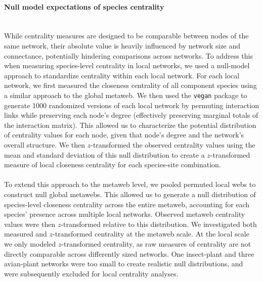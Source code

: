 \paragraph*{Null model expectations of species centrality}\mbox{}\\ 
While centrality measures are designed to be comparable between nodes of the same network, their absolute value is heavily influenced by network size and connectance, potentially hindering comparisons across networks. To address this when measuring species-level centrality in local networks, we used a null-model approach to standardize centrality within each local network. For each local network, we first measured the closeness centrality of all component species using a similar approach to the global metaweb.
We then used the \texttt{vegan} package to generate 1000 randomized versions of each local network by permuting interaction links while preserving each node's degree (effectively preserving marginal totals of the interaction matrix). This allowed us to characterize the potential distribution of centrality values for each node, given that node's degree and the network's overall structure. We then $z$-transformed the observed centrality values using the mean and standard deviation of this null distribution to create a $z$-transformed measure of local closeness centrality for each species-site combination. 


\paragraph{} To extend this approach to the metaweb level, we pooled permuted local webs to construct null global metawebs. This allowed us to generate a null distribution of species-level closeness centrality across the entire metaweb, accounting for each species' presence across multiple local networks. Observed metaweb centrality values were then $z$-transformed relative to this distribution. We investigated both measured and $z$-transformed centrality at the metaweb scale. At the local scale we only modeled $z$-transformed centrality, as raw measures of centrality are not directly comparable across differently sized networks. One insect-plant and three avian-plant networks were too small to create realistic null distributions, and were subsequently excluded for local centrality analyses. 



